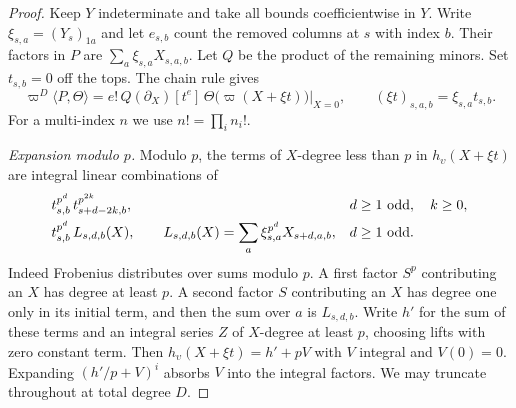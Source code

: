 \begin{proof}
Keep $Y$ indeterminate and take all bounds coefficientwise in $Y$.
Write $\xi_{s,a}=(Y_s)_{1a}$ and
let $e_{s,b}$ count the removed columns at $s$ with index $b$.
Their factors in $P$ are $\sum_a\xi_{s,a}X_{s,a,b}$. Let $Q$ be the
product of the remaining minors. Set $t_{s,b}=0$ off the tops.
The chain rule gives
\[
 \varpi^D\langle P,\Theta\rangle
 =e!\,Q(\partial_X)[t^e]\,\Theta\bigl(\varpi(X+\xi t)\bigr)
       \big|_{X=0},
 \qquad (\xi t)_{s,a,b}=\xi_{s,a}t_{s,b}.
\]
For a multi-index $n$ we use $n!=\prod_i n_i!$.

\emph{Expansion modulo $p$.}
Modulo $p$, the terms of $X$-degree less than $p$ in
$h_\upsilon(X+\xi t)$ are integral linear combinations of
\begin{align*}
 &t_{s,b}^{p^d}\,t_{s+d-2k,b}^{p^{2k}},
                &&d\ge1\ {\rm odd},\quad k\ge0,\\
 &t_{s,b}^{p^d}\,L_{s,d,b}(X),\qquad
 L_{s,d,b}(X)=\sum_a\xi_{s,a}^{p^d}X_{s+d,a,b},
                &&d\ge1\ {\rm odd}.
\end{align*}
Indeed Frobenius distributes over sums modulo $p$. A first factor
$S^p$ contributing an $X$ has degree at least $p$. A second factor
$S$ contributing an $X$ has degree one only in its initial term, and
then the sum over $a$ is $L_{s,d,b}$.
Write $h'$ for the sum of these terms and an integral series $Z$ of
$X$-degree at least $p$, choosing lifts with zero constant term.
Then $h_\upsilon(X+\xi t)=h'+pV$ with $V$ integral and $V(0)=0$.
Expanding $(h'/p+V)^i$ absorbs $V$ into the integral factors.
We may truncate throughout at total degree $D$.


\end{proof}
